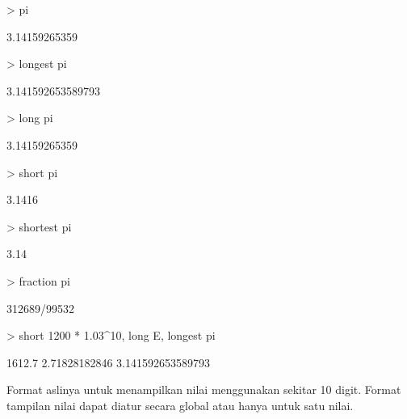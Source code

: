 \documentclass[a4paper,10pt]{article}
\begin{document}
\begin{eulernotebook}
\begin{eulercomment}
\begin{eulercomment}
\begin{eulercomment}
\end{eulercomment}
\begin{eulerprompt}
> pi
\end{eulerprompt}
\begin{euleroutput}
  3.14159265359
\end{euleroutput}
\begin{eulerprompt}
> longest pi
\end{eulerprompt}
\begin{euleroutput}
        3.141592653589793 
\end{euleroutput}
\begin{eulerprompt}
> long pi
\end{eulerprompt}
\begin{euleroutput}
  3.14159265359
\end{euleroutput}
\begin{eulerprompt}
> short pi
\end{eulerprompt}
\begin{euleroutput}
  3.1416
\end{euleroutput}
\begin{eulerprompt}
> shortest pi
\end{eulerprompt}
\begin{euleroutput}
       3.14 
\end{euleroutput}
\begin{eulerprompt}
> fraction pi
\end{eulerprompt}
\begin{euleroutput}
  312689/99532
\end{euleroutput}
\begin{eulerprompt}
> short 1200 * 1.03^10, long E, longest pi
\end{eulerprompt}
\begin{euleroutput}
  1612.7
  2.71828182846
        3.141592653589793 
\end{euleroutput}
\begin{eulercomment}
Format aslinya untuk menampilkan nilai menggunakan sekitar 10 digit.
Format tampilan nilai dapat diatur secara global atau hanya untuk satu
nilai.


\end{eulercomment}
\end{eulercomment}
\end{eulercomment}
\end{eulernotebook}
\end{document}
